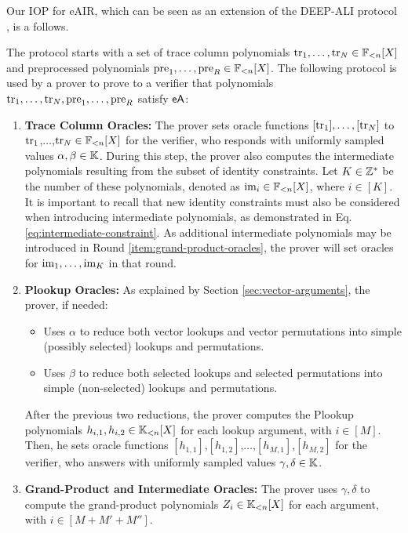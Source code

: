 Our IOP for eAIR, which can be seen as an extension of the DEEP-ALI protocol \cite{EPRINT:BGKS19}, is a follows.
\begin{protocol}\label{prot:IOP-eAIR}
  The protocol starts with a set of trace column polynomials $\text{tr}_1,\dots,\text{tr}_N \in \mathbb{F}_{<n}[X]$ and preprocessed polynomials $\text{pre}_1,\dots,\text{pre}_R \in \mathbb{F}_{<n}[X]$. The following protocol is used by a prover to prove to a verifier that polynomials $\text{tr}_1,\dots,\text{tr}_N,\text{pre}_1,\dots,\text{pre}_R$ satisfy $\textsf{eA}$:
\begin{enumerate}
  \item \textbf{Trace Column Oracles:} The prover sets oracle functions $[\text{tr}_1],\dots,[\text{tr}_N]$ to $\text{tr}_1$,$\dots$,$\text{tr}_N \in \mathbb{F}_{<n}[X]$ for the verifier, who responds with uniformly sampled values $\alpha,\beta \in \mathbb{K}$. During this step, the prover also computes the intermediate polynomials resulting from the subset of identity constraints. Let $K \in \mathbb{Z}^*$ be the number of these polynomials, denoted as $\text{im}_i \in \mathbb{F}_{<n}[X]$, where $i \in [K]$. It is important to recall that new identity constraints must also be considered when introducing intermediate polynomials, as demonstrated in Eq. \eqref{eq:intermediate-constraint}. As additional intermediate polynomials may be introduced in Round \ref{item:grand-product-oracles}, the prover will set oracles for $\text{im}_1,\dots,\text{im}_K$ in that round. \label{item:execution-trace-oracles}

  \item \textbf{Plookup Oracles:} As explained by Section \ref{sec:vector-arguments}, the prover, if needed:
  \begin{itemize}
    \item Uses $\alpha$ to reduce both vector lookups and vector permutations into simple (possibly selected) lookups and permutations.
    \item Uses $\beta$ to reduce both selected lookups and selected permutations into simple (non-selected) lookups and permutations.
  \end{itemize}
  
  After the previous two reductions, the prover computes the Plookup polynomials $h_{i,1},h_{i,2} \in \mathbb{K}_{<n}[X]$ for each lookup argument, with $i \in [M]$. Then, he sets oracle functions $[h_{1,1}]$,$[h_{1,2}]$,$\dots$,$[h_{M,1}]$,$[h_{M,2}]$ for the verifier, who answers with uniformly sampled values $\gamma,\delta \in \mathbb{K}$. \label{item:plookup-oracles}
  
  \item \textbf{Grand-Product and Intermediate Oracles:} The prover uses $\gamma,\delta$ to compute the grand-product polynomials $Z_i \in \mathbb{K}_{<n}[X]$ for each argument, with $i \in [M+M'+M'']$.
  

\end{enumerate}
\end{protocol}
